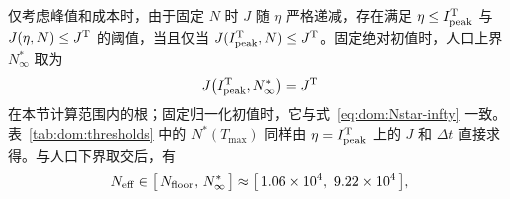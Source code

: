 仅考虑峰值和成本时，由于固定 $N$ 时 $J$ 随 $\eta$ 严格递减，存在满足 $\eta\le I_{\rm peak}^{\rm T}$ 与 $J(\eta,N)\le J^{\rm T}$ 的阈值，当且仅当 $J(I_{\rm peak}^{\rm T},N)\le J^{\rm T}$。固定绝对初值时，人口上界 $N^\ast_\infty$ 取为
\[
J\bigl(I_{\rm peak}^{\rm T},N^\ast_\infty\bigr)=J^{\rm T}
\]
在本节计算范围内的根；固定归一化初值时，它与式~\eqref{eq:dom:Nstar-infty} 一致。表~\ref{tab:dom:thresholds} 中的 $N^\ast(T_{\max})$ 同样由 $\eta=I_{\rm peak}^{\rm T}$ 上的 $J$ 和 $\Delta t$ 直接求得。与人口下界取交后，有
\begin{equation}
  N_{\rm eff}\in\bigl[\,N_{\rm floor},\,N^\ast_\infty\,\bigr]
  \approx\bigl[\,1.06\times10^{4},\ 9.22\times10^{4}\,\bigr],
  \label{eq:dom:main-interval}
\end{equation}
